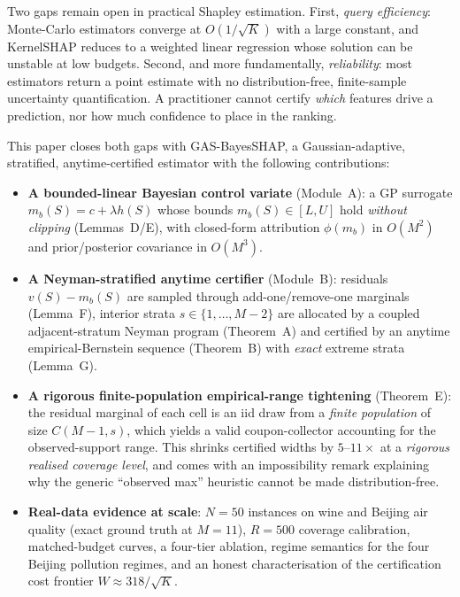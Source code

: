 \documentclass[11pt,twocolumn]{article}
\begin{document}
Two gaps remain open in practical Shapley estimation.  First, \emph{query
efficiency}: Monte-Carlo estimators \cite{castro2009} converge at $O(1/\sqrt
K)$ with a large constant, and KernelSHAP \cite{lundberg2017} reduces to a
weighted linear regression whose solution can be unstable at low budgets.
Second, and more fundamentally, \emph{reliability}: most estimators return a
point estimate with no distribution-free, finite-sample uncertainty
quantification.  A practitioner cannot certify \emph{which} features drive a
prediction, nor how much confidence to place in the ranking.

This paper closes both gaps with GAS-BayesSHAP, a Gaussian-adaptive,
stratified, anytime-certified estimator with the following contributions:
\begin{itemize}
\item \textbf{A bounded-linear Bayesian control variate} (Module~A): a GP
  surrogate $m_b(S)=c+\lambda h(S)$ whose bounds
  $m_b(S)\in[L,U]$ hold \emph{without clipping} (Lemmas~D/E), with closed-form
  attribution $\phi(m_b)$ in $O(M^2)$ and prior/posterior covariance in
  $O(M^3)$.
\item \textbf{A Neyman-stratified anytime certifier} (Module~B): residuals
  $v(S)-m_b(S)$ are sampled through add-one/remove-one marginals (Lemma~F),
  interior strata $s\in\{1,\dots,M-2\}$ are allocated by a coupled
  adjacent-stratum Neyman program (Theorem~A) and certified by an anytime
  empirical-Bernstein sequence (Theorem~B) with \emph{exact} extreme strata
  (Lemma~G).
\item \textbf{A rigorous finite-population empirical-range tightening}
  (Theorem~E): the residual marginal of each cell is an iid draw from a
  \emph{finite population} of size $C(M-1,s)$, which yields a valid
  coupon-collector accounting for the observed-support range.  This shrinks
  certified widths by $5$--$11\times$ at a \emph{rigorous realised coverage
  level}, and comes with an impossibility remark explaining why the generic
  ``observed max'' heuristic cannot be made distribution-free.
\item \textbf{Real-data evidence at scale}: $N=50$ instances on wine and
  Beijing air quality (exact ground truth at $M=11$), $R=500$ coverage
  calibration, matched-budget curves, a four-tier ablation, regime
  semantics for the four Beijing pollution regimes, and an honest
  characterisation of the certification cost frontier $W\approx318/\sqrt K$.
\end{itemize}
\end{document}
